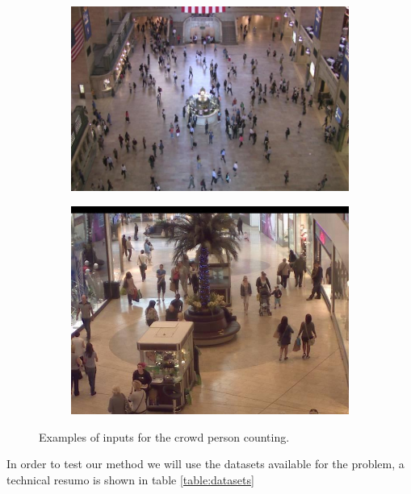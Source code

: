 \documentclass[10pt, a4paper]{article}
\begin{document}
\begin{figure}[h!]
\centering
\begin{subfigure}{0.5\textwidth}
  \centering
  \includegraphics[width=0.9\linewidth]{figs/cover.jpg}
\end{subfigure}%
\begin{subfigure}{0.5\textwidth}
  \centering
  \includegraphics[width=0.8\linewidth]{figs/mallexample.jpg}
\end{subfigure}
  \caption{Examples of inputs for the crowd person counting.}
  \label{fig:scenario}
\end{figure}

In order to test our method we will use the datasets available for the problem, a technical resumo is shown in table \ref{table:datasets}
\end{document}
